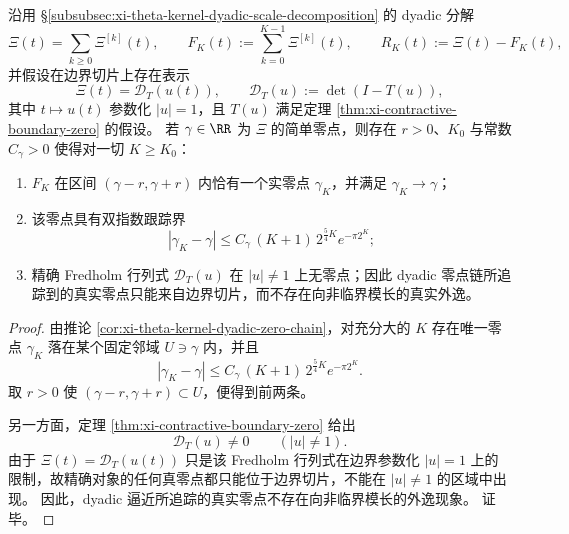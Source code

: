 \begin{theorem}\label{thm:xi-time-part9q-dyadic-boundary-zero-no-escape}
沿用 \S\ref{subsubsec:xi-theta-kernel-dyadic-scale-decomposition} 的 dyadic 分解
\[
\Xi(t)=\sum_{k\ge 0}\Xi^{[k]}(t),
\qquad
F_K(t):=\sum_{k=0}^{K-1}\Xi^{[k]}(t),
\qquad
R_K(t):=\Xi(t)-F_K(t),
\]
并假设在边界切片上存在表示
\[
\Xi(t)=\mathcal D_T(u(t)),
\qquad
\mathcal D_T(u):=\det(I-T(u)),
\]
其中 \(t\mapsto u(t)\) 参数化 \(|u|=1\)，且 \(T(u)\) 满足定理 \ref{thm:xi-contractive-boundary-zero} 的假设。
若 \(\gamma\in\RR\) 为 \(\Xi\) 的简单零点，则存在 \(r>0\)、\(K_0\) 与常数 \(C_\gamma>0\) 使得对一切 \(K\ge K_0\)：
\begin{enumerate}
  \item \(F_K\) 在区间 \((\gamma-r,\gamma+r)\) 内恰有一个实零点 \(\gamma_K\)，并满足 \(\gamma_K\to\gamma\)；
  \item 该零点具有双指数跟踪界
  \[
  |\gamma_K-\gamma|
  \le
  C_\gamma\,(K+1)\,2^{\frac54 K}e^{-\pi 2^K};
  \]
  \item 精确 Fredholm 行列式 \(\mathcal D_T(u)\) 在 \(|u|\neq 1\) 上无零点；因此 dyadic 零点链所追踪到的真实零点只能来自边界切片，而不存在向非临界模长的真实外逸。
\end{enumerate}
\end{theorem}
\begin{proof}
由推论 \ref{cor:xi-theta-kernel-dyadic-zero-chain}，对充分大的 \(K\) 存在唯一零点 \(\gamma_K\) 落在某个固定邻域 \(U\ni\gamma\) 内，并且
\[
|\gamma_K-\gamma|
\le
C_\gamma\,(K+1)\,2^{\frac54 K}e^{-\pi 2^K}.
\]
取 \(r>0\) 使 \((\gamma-r,\gamma+r)\subset U\)，便得到前两条。

另一方面，定理 \ref{thm:xi-contractive-boundary-zero} 给出
\[
\mathcal D_T(u)\neq 0
\qquad(|u|\neq 1).
\]
由于 \(\Xi(t)=\mathcal D_T(u(t))\) 只是该 Fredholm 行列式在边界参数化 \(|u|=1\) 上的限制，故精确对象的任何真零点都只能位于边界切片，不能在 \(|u|\neq 1\) 的区域中出现。
因此，dyadic 逼近所追踪的真实零点不存在向非临界模长的外逸现象。
证毕。
\end{proof}

\endinput
